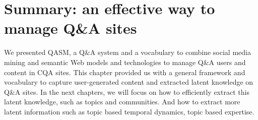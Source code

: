 \section{Summary: an effective way to manage Q\&A sites}
\label{sec:future}
We presented QASM, a Q\&A system and a vocabulary to combine social media mining and semantic Web models and technologies to manage Q\&A users and content in CQA sites. This chapter provided us with a general framework and vocabulary to capture user-generated content and extracted latent knowledge on Q\&A sites. In the next chapters, we will focus on how to efficiently extract this latent knowledge, such as topics and communities. And how to extract more latent information such as topic based temporal dynamics, topic based expertise.





